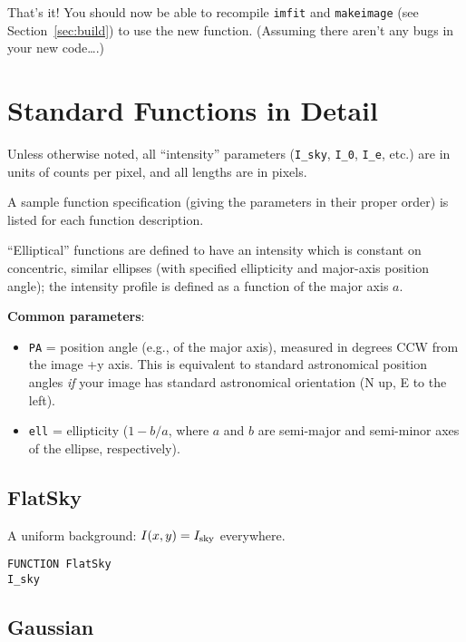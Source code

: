\documentclass[10pt]{article}
\newcommand{\imfit}{\texttt{imfit}}
\newcommand{\makeimage}{\texttt{makeimage}}
\begin{document}
\bigskip

That's it! You should now be able to recompile \imfit{} and \makeimage{} 
(see Section~\ref{sec:build}) to use
the new function. (Assuming there aren't any bugs in your new code\ldots.)




\appendix
\section{Standard Functions in Detail}\label{app:functions}

Unless otherwise noted, all ``intensity'' parameters (\texttt{I\_sky},
\texttt{I\_0}, \texttt{I\_e}, etc.) are in units of counts per pixel, and all
lengths are in pixels.

A sample function specification (giving the parameters in their proper order) is
listed for each function description.

``Elliptical'' functions are defined to have an intensity which is constant on
concentric, similar ellipses (with specified ellipticity and major-axis position angle);
the intensity profile is defined as a function of the major axis $a$.

\medskip

\textbf{Common parameters}: 
\begin{itemize}
\item \texttt{PA} = position angle (e.g., of the major axis), measured in degrees CCW from
the image +y axis. This is equivalent to standard astronomical position angles \textit{if}
your image has standard astronomical orientation (N up, E to the left).
\item \texttt{ell} = ellipticity ($1 - b/a$, where $a$ and $b$ are semi-major and semi-minor
axes of the ellipse, respectively).
\end{itemize}


\subsection{FlatSky}

A uniform background: $I(x,y) = I_{\rm sky}$ everywhere.

\begin{verbatim}
FUNCTION FlatSky
I_sky
\end{verbatim}


\subsection{Gaussian}
\end{document}
